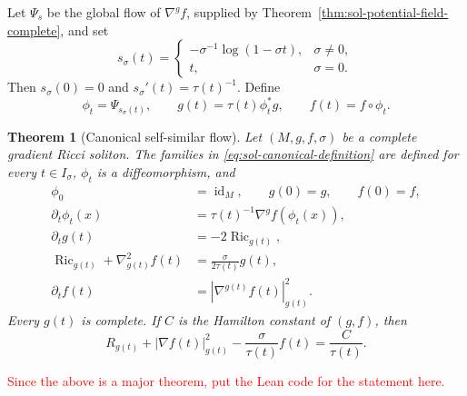\documentclass[10pt]{coll-l}
\newtheorem{theorem}{Theorem}[chapter]
\theoremstyle{definition}
\theoremstyle{remark}
\numberwithin{section}{chapter}
\numberwithin{equation}{chapter}
\newcommand{\Ric}{\operatorname{Ric}}
\begin{document}
Let $\Psi_s$ be the global flow of $\nabla^gf$, supplied by
Theorem~\ref{thm:sol-potential-field-complete}, and set
\begin{equation}
 s_\sigma(t)=
 \begin{cases}
 -\sigma^{-1}\log(1-\sigma t),&\sigma\ne0,\\
 t,&\sigma=0.
 \end{cases}                                             \label{eq:sol-canonical-time-change}
\end{equation}
Then $s_\sigma(0)=0$ and $s_\sigma'(t)=\tau(t)^{-1}$.  Define
\begin{equation}
 \phi_t=\Psi_{s_\sigma(t)},\qquad
 g(t)=\tau(t)\phi_t^*g,\qquad
 f(t)=f\circ\phi_t.                                      \label{eq:sol-canonical-definition}
\end{equation}

\begin{theorem}[Canonical self-similar flow]
\label{thm:sol-canonical-flow}
Let $(M,g,f,\sigma)$ be a complete gradient Ricci soliton.  The families in
\eqref{eq:sol-canonical-definition} are defined for every $t\in I_\sigma$,
$\phi_t$ is a diffeomorphism, and
\begin{align}
 \phi_0&=\operatorname{id}_M,\qquad g(0)=g,\qquad f(0)=f,  \label{eq:sol-canonical-initial}\\
 \partial_t\phi_t(x)
   &=\tau(t)^{-1}\nabla^gf(\phi_t(x)),                  \label{eq:sol-canonical-diffeomorphism}\\
 \partial_tg(t)&=-2\Ric_{g(t)},                           \label{eq:sol-canonical-ricci-flow}\\
 \Ric_{g(t)}+\nabla_{g(t)}^2f(t)
   &=\frac{\sigma}{2\tau(t)}g(t),                        \label{eq:sol-canonical-soliton}\\
 \partial_tf(t)&=|\nabla^{g(t)}f(t)|_{g(t)}^2.            \label{eq:sol-canonical-potential-time}
\end{align}
Every $g(t)$ is complete.  If $C$ is the Hamilton constant of $(g,f)$,
then
\begin{equation}
 R_{g(t)}+|\nabla f(t)|_{g(t)}^2
   -\frac{\sigma}{\tau(t)}f(t)=\frac{C}{\tau(t)}.         \label{eq:sol-canonical-hamilton-constant}
\end{equation}
\end{theorem}

\textcolor{red}{Since the above is a major theorem, put the Lean code for the statement here.}
\end{document}
